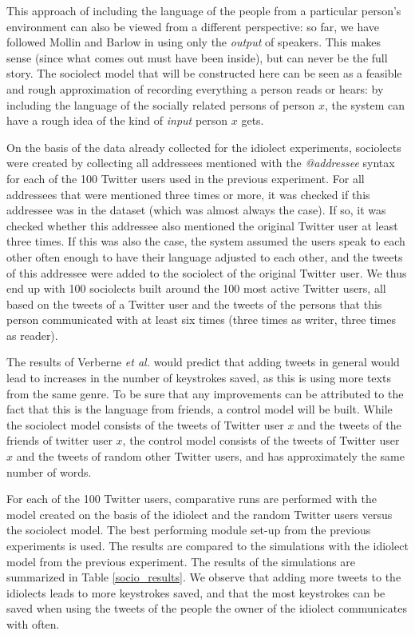 \documentclass[12pt]{article}
\begin{document}
{This approach of including the language of the people from a particular person's environment can also be viewed from a different perspective: so far, we have followed Mollin \citeyear{mollin09} and Barlow\citeyear{barlow10} in using only the \emph{output} of speakers. This makes sense (since what comes out must have been inside), but can never be the full story. The sociolect model that will be constructed here can be seen as a feasible and rough approximation of recording everything a person reads or hears: by including the language of the socially related persons of person $x$, the system can have a rough idea of the kind of \emph{input} person $x$ gets.

On the basis of the data already collected for the idiolect experiments, sociolects were created by collecting all addressees mentioned with the \emph{@addressee} syntax for each of the 100 Twitter users used in the previous experiment. For all addressees that were mentioned three times or more, it was checked if this addressee was in the dataset (which was almost always the case). If so, it was checked whether this addressee also mentioned the original Twitter user at least three times. If this was also the case, the system assumed the users speak to each other often enough to have their language adjusted to each other, and the tweets of this addressee were added to the sociolect of the original Twitter user. We thus end up with 100 sociolects built around the 100 most active Twitter users, all based on the tweets of a Twitter user and the tweets of the persons that this person communicated with at least six times (three times as writer, three times as reader).

The results of Verberne {\em et al.} \citeyear{verberne+12} would predict that adding tweets in general would lead to increases in the number of keystrokes saved, as this is using more texts from the same genre. To be sure that any improvements can be attributed to the fact that this is the language from friends, a control model will be built. While the sociolect model consists of the tweets of Twitter user $x$ and the tweets of the friends of twitter user $x$, the control model consists of the tweets of Twitter user $x$ and the tweets of random other Twitter users, and has approximately the same number of words.

For each of the 100 Twitter users, comparative runs are performed with the model created on the basis of the idiolect and the random Twitter users versus the sociolect model. The best performing module set-up from the previous experiments is used.  The results are compared to the simulations with the idiolect model from the previous experiment. The results of the simulations are summarized in Table \ref{socio_results}.
We observe that adding more tweets to the idiolects leads to more keystrokes saved, and that the most keystrokes can be saved when using the tweets of the people the owner of the idiolect communicates with often.

}
\end{document}
